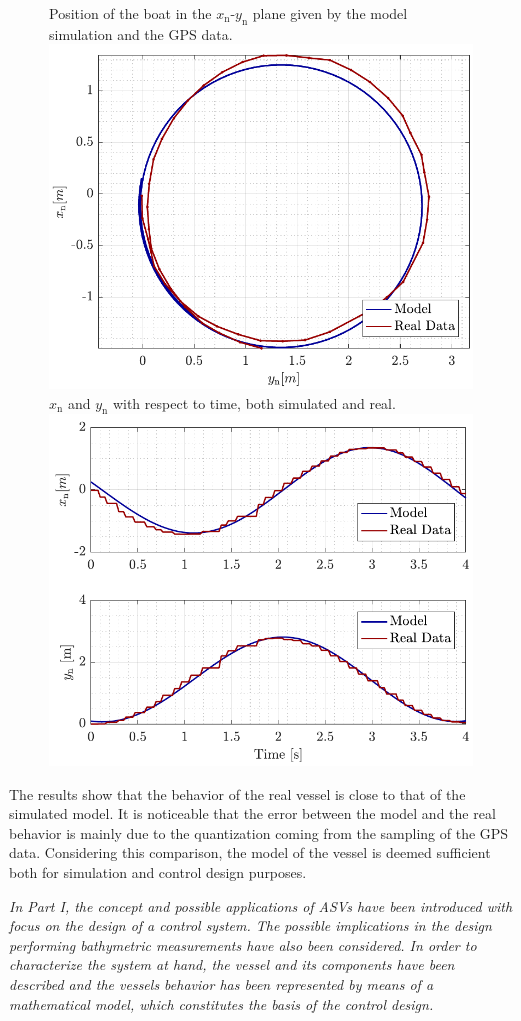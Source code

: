 \begin{figure}[H]
    \captionbox 
    {   
        Position of the boat in the $x_\mathrm{n}$-$y_\mathrm{n}$ plane given by the model simulation and the GPS data.
        \label{fig:turn}
    }                                                                 
    {                                                                  
        \includegraphics[width=.45\textwidth]{figures/turn}         
    }                                                                    
    \hspace{5pt}                                                          
    \captionbox  
    {      
        $x_\mathrm{n}$ and $y_\mathrm{n}$ with respect to time, both simulated and real.
        \label{fig:turn_time}
    }                                                                        
    {
        \includegraphics[width=.45\textwidth]{figures/turn_time}
    }
\end{figure}

The results show that the behavior of the real vessel is close to that of the simulated model. It is noticeable that the error between the model and the real behavior is mainly due to the quantization coming from the sampling of the GPS data. Considering this comparison, the model of the vessel is deemed sufficient both for simulation and control design purposes. 

{\vspace*{\fill}
\textit{In Part I, the concept and possible applications of ASVs have been introduced with focus on the design of a control system. The possible implications in the design  performing bathymetric measurements have also been considered. In order to characterize the system at hand, the vessel and its components have been described and the vessels behavior has been represented by means of a mathematical model, which constitutes the basis of the control design.}}


